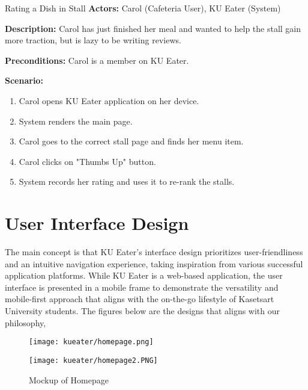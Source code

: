 \begin{usecase}{Rating a Dish in Stall}
    \textbf{Actors:} Carol (Cafeteria User), KU Eater (System)

    \textbf{Description:} Carol has just finished her meal and wanted to help the stall gain more traction, but is lazy to be writing reviews.

    \textbf{Preconditions:} Carol is a member on KU Eater.

    \textbf{Scenario:}

    \begin{enumerate}[leftmargin=80pt]
        \item Carol opens KU Eater application on her device.
        \item System renders the main page.
        \item Carol goes to the correct stall page and finds her menu item.
        \item Carol clicks on "Thumbs Up" button.
        \item System records her rating and uses it to re-rank the stalls.
    \end{enumerate}
\end{usecase}


\newpage

\section{User Interface Design}
\label{section:user-interface-design}

The main concept is that KU Eater's interface design prioritizes user-friendliness and an intuitive navigation experience,
taking inspiration from various successful application platforms. While KU Eater is a web-based application,
the user interface is presented in a mobile frame to demonstrate the versatility and mobile-first approach that aligns with
the on-the-go lifestyle of Kasetsart University students. The figures below are the designs that aligns with our philosophy,

\begin{figure}[h!]
    \begin{minipage}{.5\textwidth}
        \centering
        \texttt{[image: kueater/homepage.png]}
    \end{minipage}%
    \begin{minipage}{.5\textwidth}
        \centering
        \texttt{[image: kueater/homepage2.PNG]}
    \end{minipage}
    \caption{Mockup of Homepage}
    \vspace*{-\baselineskip}
\end{figure}

